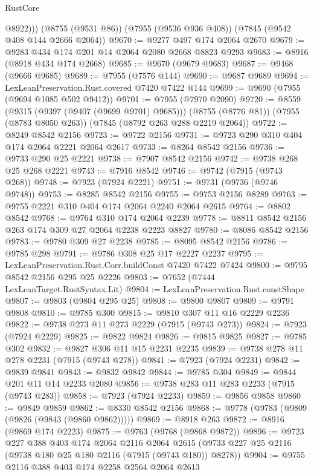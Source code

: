 \begin{lexlean}{RustCore}
\begin{coremodule}
          @8922)))
    (@8755 (@9531 @86))
    (@7955 (@9536 @936 @408))
    (@7845 (@9542 @408 @144 @2666 @2064))
@9670 := @9277 @497 @174 @2064 @2670
@9679 := @9283 @434 @174 @201 @14 @2064 @2080 @2668 @8823 @9293
@9683 := @8916 (@8918 @434 @174 @2668)
@9685 := @9670 (@9679 @9683)
@9687 := @9468 (@9666 @9685)
@9689 := @7955 (@7576 @144)
@9690 := @9687 @9689
@9694 := LexLeanPreservation.Rust.covered @7420 @7422 @144
@9699 := @9690 (@7955 (@9694 @1085 @502 @9412))
@9701 := @7955 (@7970 @2090)
@9720 := @8559
    (@9315 (@9397 (@9407 (@9699 @9701) @9685)))
    (@8755 (@8776 @81))
    (@7955 (@8783 @8050 @263))
    (@7845 (@8792 @263 @288 @2219 @2064))
@9722 := @8249 @8542 @2156
@9723 := @9722 @2156
@9731 := @9723 @290 @310 @404 @174 @2064 @2221 @2064 @2617
@9733 := @8264 @8542 @2156
@9736 := @9733 @290 @25 @2221
@9738 := @7907 @8542 @2156
@9742 := @9738 @268 @25 @268 @2221
@9743 := @7916 @8542
@9746 := @9742 (@7915 (@9743 @268))
@9748 := @7923 (@7924 @2221)
@9751 := @9731 (@9736 (@9746 @9748))
@9753 := @8285 @8542 @2156
@9755 := @9753 @2156 @8289
@9763 := @9755 @2221 @310 @404 @174 @2064 @2240 @2064 @2615
@9764 := @8802 @8542
@9768 := @9764 @310 @174 @2064 @2239
@9778 := @8811 @8542 @2156 @263 @174 @309 @27 @2064 @2238 @2223 @8827
@9780 := @8086 @8542 @2156
@9783 := @9780 @309 @27 @2238
@9785 := @8095 @8542 @2156
@9786 := @9785 @298
@9791 := @9786 @308 @25 @17 @2227 @2237
@9795 := LexLeanPreservation.Rust.Corr.buildConst @7420 @7422 @7424
@9800 := @9795 @8542 @2156 @295 @25 @2226
@9803 := @7652 (@7444 LexLeanTarget.RustSyntax.Lit)
@9804 := LexLeanPreservation.Rust.constShape
@9807 := @9803 (@9804 @295 @25)
@9808 := @9800 @9807
@9809 := @9791 @9808
@9810 := @9785 @300
@9815 := @9810 @307 @11 @16 @2229 @2236
@9822 := @9738 @273 @11 @273 @2229 (@7915 (@9743 @273))
@9824 := @7923 (@7924 @2229)
@9825 := @9822 @9824
@9826 := @9815 @9825
@9827 := @9785 @302
@9832 := @9827 @306 @11 @15 @2231 @2235
@9839 := @9738 @278 @11 @278 @2231 (@7915 (@9743 @278))
@9841 := @7923 (@7924 @2231)
@9842 := @9839 @9841
@9843 := @9832 @9842
@9844 := @9785 @304
@9849 := @9844 @201 @11 @14 @2233 @2080
@9856 := @9738 @283 @11 @283 @2233 (@7915 (@9743 @283))
@9858 := @7923 (@7924 @2233)
@9859 := @9856 @9858
@9860 := @9849 @9859
@9862 := @8330 @8542 @2156
@9868 := @9778 (@9783 (@9809 (@9826 (@9843 (@9860 @9862)))))
@9869 := @8918 @263
@9872 := @8916 (@9869 @174 @2223)
@9875 := @9763 (@9768 (@9868 @9872))
@9896 := @9723
    @227
    @388
    @403
    @174
    @2064
    @2116
    @2064
    @2615
    (@9733 @227 @25 @2116 (@9738 @180 @25 @180 @2116 (@7915 (@9743 @180)) @8278))
@9904 := @9755 @2116 @388 @403 @174 @2258 @2564 @2064 @2613

\end{coremodule}
\end{lexlean}
